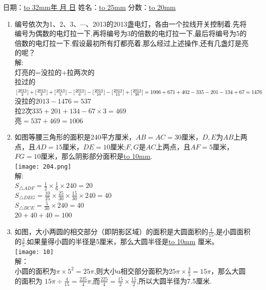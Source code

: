 \documentclass[12pt,oneside,a4paper]{ctexbook} %
\numberwithin{chapter}{part}
\begin{document}
\pagestyle{fancy}
\chead{}
\lfoot{}
\rfoot{}

日期：\underline{\hbox to 32mm{\renewcommand{\today}{\number\year 年 \number\month 月 \number\day 日}\today}}
\qquad 姓名：\underline{\hbox to 25mm{}} \qquad 分数：\underline{\hbox to 20mm{}}

\begin{enumerate}
\item 
编号依次为1、2、3、$\cdots$、2013的2013盏电灯，各由一个拉线开关控制着.先将编号为偶数的电灯拉一下,再将编号为3的倍数的电灯拉一下,最后将编号为5的倍数的电灯拉一下.假设最初所有灯都亮着,那么经过上述操作,还有几盏灯是亮的呢？\\
解:\\
灯亮的=没拉的+拉两次的\\
拉过的\\$[\frac{2013}{2}]+[\frac{2013}{3}]+[\frac{2013}{5}]-[\frac{2013}{6}]-[\frac{2013}{10}]-[\frac{2013}{15}]+[\frac{2013}{30}]\\
=1006+671+402-335-201-134+67=1476$\\
没拉的$2013-1476=537$\\
拉2次$335+201+134-67\times3=469$\\
亮$=537+469=1006$

\item 
如图等腰三角形的面积是240平方厘米，$AB=AC=30$厘米，$D,E$为$AB$上两点，且$AD=15$厘米，$DE=10$厘米;$F,G$是$AC$上两点，且$AF=5$厘米，
$FG=10$厘米，那么阴影部分面积是\underline{\hbox to 10mm{}}.\\
\texttt{[image: 204.png]}\\
解:\\
$S_{\triangle ADF}=\frac{1}{2}\times\frac{1}{6}\times240=20$\\
$S_{\triangle DEG}=\frac{10}{25}\times\frac{25}{30}\times\frac{15}{30}\times240=40$\\
$S_{\triangle BCE}=\frac{5}{30}\times240=40$\\
$20+40+40=100$

\item 
如图，大小两圆的相交部分（即阴影区域）的面积是大圆面积的$\frac{4}{15}$,是小圆面积的$\frac{3}{5}$.如果量得小圆的半径是5厘米，那么大圆半径是\underline{\hbox to 10mm{}} 厘米。\\
\texttt{[image: 10]}\\
解：\\
小圆的面积为$\pi\times5^2=25\pi$,则大小u相交部分面积为$25\pi\times\frac{3}{5}= 15\pi$，那么大圆的面积为
$15\pi\div\frac{4}{15}= \frac{225}{4}\pi$,而$\frac{225}{4}=\frac{15}{2}\times\frac{15}{2}$,所以大圆半径为7.5厘米.


\end{enumerate}
\end{document}
